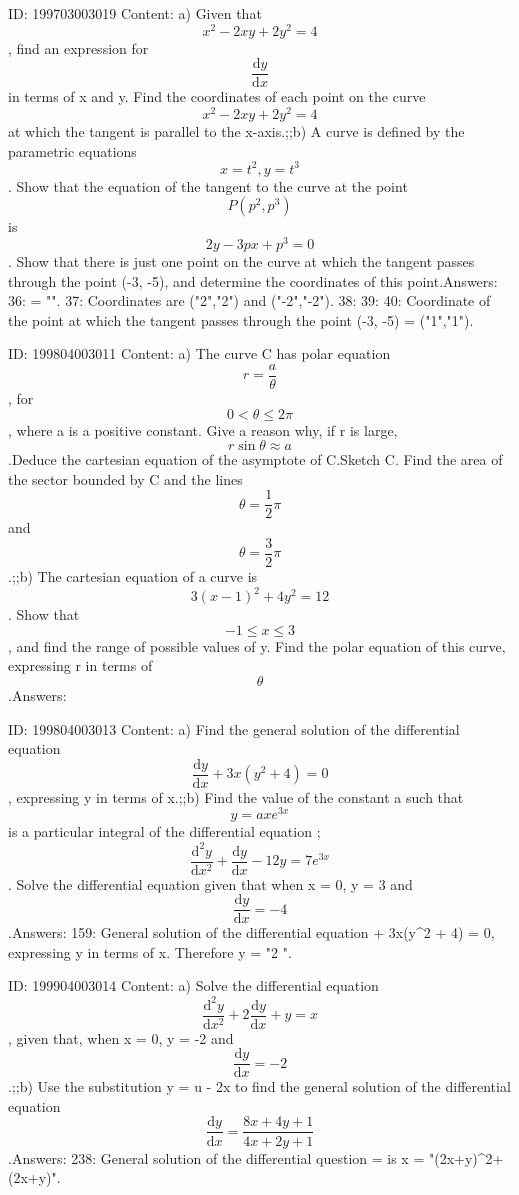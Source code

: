 \documentclass{article}
\begin{document}
ID: 199703003019
Content:
a) Given that \[x^{2} - 2xy + 2y^{2} = 4\], find an expression for \[\frac{\mathrm{d} y}{\mathrm{d} x}\] in terms of x and y. Find the coordinates of each point on the curve \[x^{2} - 2xy + 2y^{2} = 4\] at which the tangent is parallel to the x-axis.;;b) A curve is defined by the parametric equations \[x = t^{2}, y = t^{3}\]. Show that the equation of the tangent to the curve at the point \[P(p^{2}, p^{3})\] is \[2y - 3px + p^{3} = 0\]. Show that there is just one point on the curve at which the tangent passes through the point (-3, -5), and determine the coordinates of this point.Answers:
36:  = "".
37: Coordinates are ("2","2") and ("-2","-2").
38: 
39: 
40: Coordinate of the point at which the tangent passes through the point (-3, -5) = ("1","1").

ID: 199804003011
Content:
a) The curve C has polar equation \[r = \frac {a}{\theta}\], for \[0 < \theta \leq 2\pi\],  where a is a positive constant. Give a reason why, if r is large, \[r\sin \theta \approx a\].Deduce the cartesian equation of the asymptote of C.Sketch C. Find the area of the sector bounded by C and the lines \[\theta = \frac {1}{2} \pi\] and \[\theta = \frac {3}{2} \pi\].;;b) The cartesian equation of a curve is \[3(x - 1)^2 + 4y^2 = 12\]. Show that \[-1 \leq x \leq 3\], and find the range of possible values of y. Find the polar equation of this curve, expressing r in terms of \[\theta\].Answers:

ID: 199804003013
Content:
a) Find the general solution of the differential equation \[\frac{\mathrm{d} y}{\mathrm{d} x} + 3x(y^2 + 4) = 0\], expressing y in terms of x.;;b) Find the value of the constant a such that \[y=axe^{3x}\] is a particular integral of the differential equation ;\[\frac{\mathrm{d}^2 y}{\mathrm{d} x^2} + \frac{\mathrm{d} y}{\mathrm{d} x} - 12y = 7e^{3x}\]. Solve the differential equation given that when x = 0, y = 3 and \[\frac{\mathrm{d} y}{\mathrm{d} x} = - 4\].Answers:
159: General solution of the differential equation  + 3x(y^2 + 4) = 0, expressing y in terms of x. Therefore y = "2 ".

ID: 199904003014
Content:
a) Solve the differential equation \[\frac{\mathrm{d}^2 y}{\mathrm{d} x^2} + 2\frac{\mathrm{d} y}{\mathrm{d} x} + y = x\], given that, when x = 0, y = -2 and \[\frac{\mathrm{d} y}{\mathrm{d} x} = -2\].;;b) Use the substitution y = u - 2x to find the general solution of the differential equation \[\frac{\mathrm{d} y}{\mathrm{d} x} = \frac {8x + 4y + 1}{4x + 2y + 1}\].Answers:
238: General solution of the differential question  =  is x = "(2x+y)^2+(2x+y)".
\end{document}
